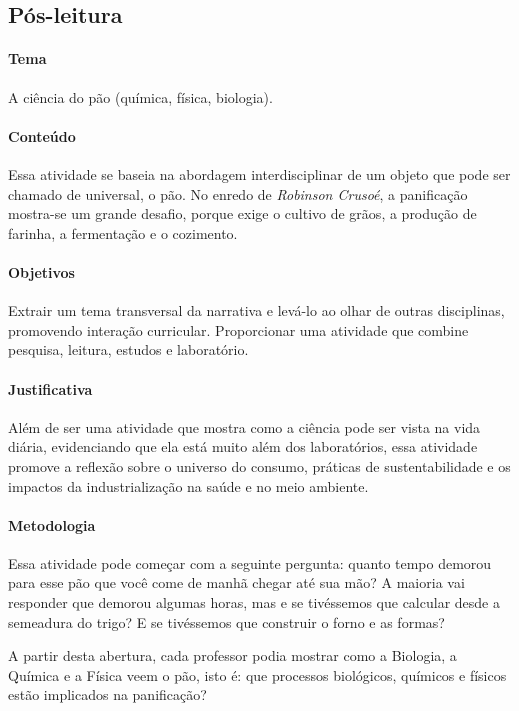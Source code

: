 \documentclass[12pt]{extarticle}
\begin{document}
\subsection{Pós-leitura}

\paragraph{Tema} A ciência do pão (química, física, biologia).


\paragraph{Conteúdo}
Essa atividade se baseia na abordagem interdisciplinar de um objeto que
pode ser chamado de universal, o pão. No enredo de \emph{Robinson Crusoé}, a panificação mostra-se um grande
desafio, porque exige o cultivo de grãos, a produção de farinha, a
fermentação e o cozimento.

\paragraph{Objetivos} Extrair um tema transversal da narrativa e
levá-lo ao olhar de outras disciplinas, promovendo interação
curricular. Proporcionar uma atividade que combine pesquisa,
leitura, estudos e laboratório.

\paragraph{Justificativa}

Além de ser uma atividade que mostra como a ciência pode ser vista na vida
diária, evidenciando que ela está muito além dos laboratórios, essa
atividade promove a reflexão sobre o universo do consumo, práticas de
sustentabilidade e os impactos da industrialização na saúde e no meio
ambiente.

\paragraph{Metodologia}
Essa atividade pode começar com a seguinte pergunta: quanto tempo
demorou para esse pão que você come de manhã chegar até sua mão? A
maioria vai responder que demorou algumas horas, mas e se tivéssemos que
calcular desde a semeadura do trigo? E se tivéssemos que construir o
forno e as formas?

A partir desta abertura, cada professor podia mostrar como a Biologia, a
Química e a Física veem o pão, isto é: que processos biológicos,
químicos e físicos estão implicados na panificação?
\end{document}
